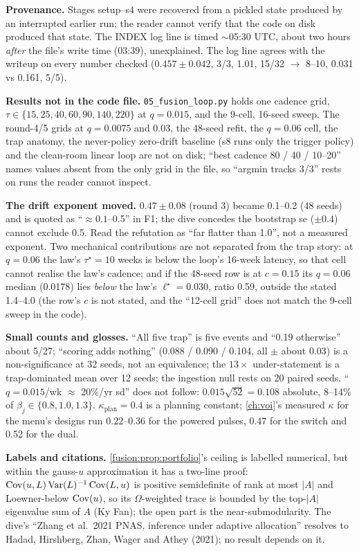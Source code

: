 \begin{reviewernote}[(compiler)]
\textbf{Provenance.} Stages setup--s4 were recovered from a pickled state produced by an interrupted earlier run; the reader cannot verify that the code on disk produced that state. The INDEX log line is timed $\sim$05:30 UTC, about two hours \emph{after} the file's write time (03:39), unexplained. The log line agrees with the writeup on every number checked ($0.457 \pm 0.042$, 3/3, 1.01, 15/32 $\to$ 8--10, 0.031 vs 0.161, 5/5).

\textbf{Results not in the code file.} \texttt{05\_fusion\_loop.py} holds one cadence grid, $\tau \in \{15, 25, 40, 60, 90, 140, 220\}$ at $q = 0.015$, and the 9-cell, 16-seed sweep. The round-4/5 grids at $q = 0.0075$ and $0.03$, the 48-seed refit, the $q = 0.06$ cell, the trap anatomy, the never-policy zero-drift baseline (s8 runs only the trigger policy) and the clean-room linear loop are not on disk; ``best cadence 80 / 40 / 10--20'' names values absent from the only grid in the file, so ``argmin tracks 3/3'' rests on runs the reader cannot inspect.

\textbf{The drift exponent moved.} $0.47 \pm 0.08$ (round 3) became 0.1--0.2 (48 seeds) and is quoted as ``$\approx 0.1$--0.5'' in F1; the dive concedes the bootstrap se ($\pm 0.4$) cannot exclude 0.5. Read the refutation as ``far flatter than 1.0'', not a measured exponent. Two mechanical contributions are not separated from the trap story: at $q = 0.06$ the law's $\tau^\star = 10$ weeks is below the loop's 16-week latency, so that cell cannot realise the law's cadence; and if the 48-seed row is at $c = 0.15$ its $q = 0.06$ median (0.0178) lies \emph{below} the law's $\ell^\star = 0.030$, ratio 0.59, outside the stated 1.4--4.0 (the row's $c$ is not stated, and the ``12-cell grid'' does not match the 9-cell sweep in the code).

\textbf{Small counts and glosses.} ``All five trap'' is five events and ``0.19 otherwise'' about 5/27; ``scoring adds nothing'' (0.088 / 0.090 / 0.104, all $\pm$ about 0.03) is a non-significance at 32 seeds, not an equivalence; the $13\times$ under-statement is a trap-dominated mean over 12 seeds; the ingestion null rests on 20 paired seeds. ``$q = 0.015$/wk $\approx$ 20\%/yr sd'' does not follow: $0.015\sqrt{52} = 0.108$ absolute, 8--14\% of $\beta_j \in \{0.8, 1.0, 1.3\}$. $\kappa_{\mathrm{plan}} = 0.4$ is a planning constant; \cref{ch:voi}'s measured $\kappa$ for the menu's designs run 0.22--0.36 for the powered pulses, 0.47 for the switch and 0.52 for the dual.

\textbf{Labels and citations.} \cref{fusion:prop:portfolio}'s ceiling is labelled numerical, but within the gauss-$u$ approximation it has a two-line proof: $\operatorname{Cov}(u,L)\operatorname{Var}(L)^{-1}\operatorname{Cov}(L,u)$ is positive semidefinite of rank at most $|A|$ and Loewner-below $\operatorname{Cov}(u)$, so its $\Omega$-weighted trace is bounded by the top-$|A|$ eigenvalue sum of $A$ (Ky Fan); the open part is the near-submodularity. The dive's ``Zhang et al.\ 2021 PNAS, inference under adaptive allocation'' resolves to Hadad, Hirshberg, Zhan, Wager and Athey (2021); no result depends on it.
\end{reviewernote}

